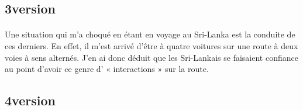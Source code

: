 \subsection{3\ieme version}
\paragraph{}
Une situation qui m'a choqué en étant en voyage au Sri-Lanka est la conduite de ces derniers. En effet, il m'est arrivé d'être à quatre voitures sur une route à deux voies à sens alternés. J'en ai donc déduit que les Sri-Lankais se faisaient confiance au point d'avoir ce genre d' « interactions » sur la route.

\subsection{4\ieme version}
